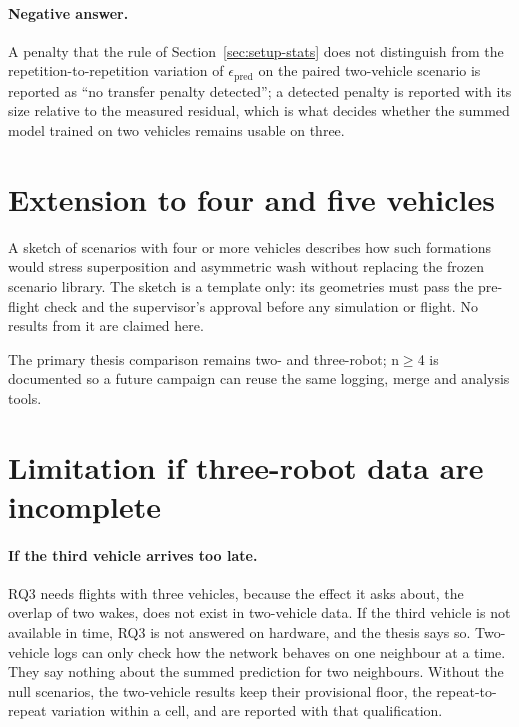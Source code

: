 
\paragraph{Negative answer.} A penalty that the rule of Section~\ref{sec:setup-stats} does not
distinguish from the repetition-to-repetition variation of $\epsilon_{\mathrm{pred}}$ on the paired
two-vehicle scenario is reported as ``no transfer penalty detected''; a detected penalty is reported
with its size relative to the measured residual, which is what decides whether the summed model
trained on two vehicles remains usable on three.

\section{Extension to four and five vehicles}
\label{sec:res3-n4sketch}

A sketch of scenarios with four or more vehicles describes how such formations would stress
superposition and asymmetric wash without replacing the frozen scenario library. The sketch is a
template only: its geometries must pass the pre-flight check and the supervisor's approval before any
simulation or flight. No results from it are claimed here.

The primary thesis comparison remains two- and three-robot; n$\geq$4 is documented so a future
campaign can reuse the same logging, merge and analysis tools.

\section{Limitation if three-robot data are incomplete}
\label{sec:res3-limitation}

\paragraph{If the third vehicle arrives too late.}
RQ3 needs flights with three vehicles, because the effect it asks about, the overlap of two wakes,
does not exist in two-vehicle data. If the third vehicle is not available in time, RQ3 is not
answered on hardware, and the thesis says so. Two-vehicle logs can only check how the network behaves
on one neighbour at a time. They say nothing about the summed prediction for two neighbours. Without
the null scenarios, the two-vehicle results keep their provisional floor, the repeat-to-repeat
variation within a cell, and are reported with that qualification.

